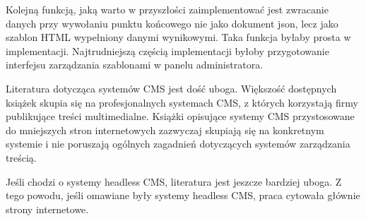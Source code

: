 Kolejną funkcją, jaką warto w przyszłości zaimplementować jest zwracanie danych
przy wywołaniu punktu końcowego nie jako dokument json, lecz jako szablon HTML
wypełniony danymi wynikowymi. Taka funkcja byłaby prosta w implementacji.
Najtrudniejszą częścią implementacji byłoby przygotowanie interfejsu zarządzania
szablonami w panelu administratora.

\medspace

Literatura dotycząca systemów CMS jest dość uboga. Większość dostępnych książek
skupia się na profesjonalnych systemach CMS, z których korzystają firmy
publikujące treści multimedialne. Książki opisujące systemy CMS przystosowane do
mniejszych stron internetowych zazwyczaj skupiają się na konkretnym systemie i
nie poruszają ogólnych zagadnień dotyczących systemów zarządzania treścią.

Jeśli chodzi o systemy headless CMS, literatura jest jeszcze bardziej uboga. Z
tego powodu, jeśli omawiane były systemy headless CMS, praca cytowała głównie
strony internetowe.
